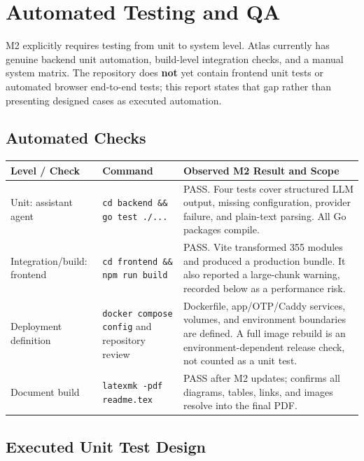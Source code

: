 \documentclass[11pt]{article}
\begin{document}
\clearpage

\section*{Automated Testing and QA}

M2 explicitly requires testing from unit to system level. Atlas currently has genuine backend unit automation, build-level integration checks, and a manual system matrix. The repository does \textbf{not} yet contain frontend unit tests or automated browser end-to-end tests; this report states that gap rather than presenting designed cases as executed automation.

\subsection*{Automated Checks}

\begin{center}
\renewcommand{\arraystretch}{1.35}
\begin{tabularx}{\textwidth}{|L{0.24\textwidth}|L{0.28\textwidth}|X|}
\hline
\textbf{Level / Check} & \textbf{Command} & \textbf{Observed M2 Result and Scope} \\
\hline
Unit: assistant agent & \texttt{cd backend \&\& go test ./...} & PASS. Four tests cover structured LLM output, missing configuration, provider failure, and plain-text parsing. All Go packages compile. \\
\hline
Integration/build: frontend & \texttt{cd frontend \&\& npm run build} & PASS. Vite transformed 355 modules and produced a production bundle. It also reported a large-chunk warning, recorded below as a performance risk. \\
\hline
Deployment definition & \texttt{docker compose config} and repository review & Dockerfile, app/OTP/Caddy services, volumes, and environment boundaries are defined. A full image rebuild is an environment-dependent release check, not counted as a unit test. \\
\hline
Document build & \texttt{latexmk -pdf readme.tex} & PASS after M2 updates; confirms all diagrams, tables, links, and images resolve into the final PDF. \\
\hline
\end{tabularx}
\end{center}

\subsection*{Executed Unit Test Design}
\end{document}
